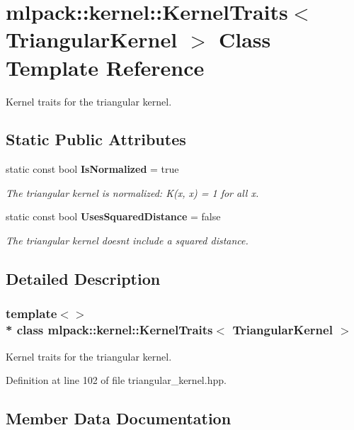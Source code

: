 \section{mlpack\+:\+:kernel\+:\+:Kernel\+Traits$<$ Triangular\+Kernel $>$ Class Template Reference}
\label{classmlpack_1_1kernel_1_1KernelTraits_3_01TriangularKernel_01_4}


Kernel traits for the triangular kernel.  


\subsection*{Static Public Attributes}
\begin{DoxyCompactItemize}
\item 
static const bool {\bf Is\+Normalized} = true
\begin{DoxyCompactList}\small\item\em The triangular kernel is normalized\+: K(x, x) = 1 for all x. \end{DoxyCompactList}\item 
static const bool {\bf Uses\+Squared\+Distance} = false
\begin{DoxyCompactList}\small\item\em The triangular kernel doesn\textquotesingle{}t include a squared distance. \end{DoxyCompactList}\end{DoxyCompactItemize}


\subsection{Detailed Description}
\subsubsection*{template$<$$>$\\*
class mlpack\+::kernel\+::\+Kernel\+Traits$<$ Triangular\+Kernel $>$}

Kernel traits for the triangular kernel. 

Definition at line 102 of file triangular\+\_\+kernel.\+hpp.



\subsection{Member Data Documentation}

